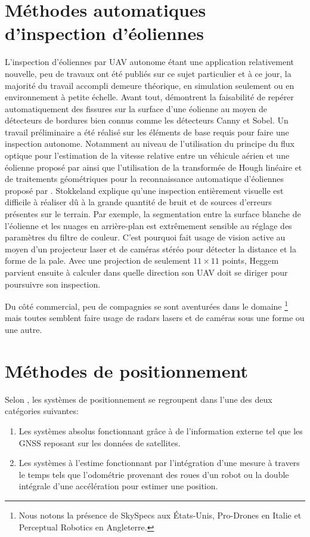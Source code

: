 \section{Méthodes automatiques d'inspection d'éoliennes}\label{subsec:eolienne}

L'inspection d'éoliennes par UAV autonome étant une application relativement nouvelle, peu de travaux ont été publiés sur ce sujet particulier et à ce jour, la majorité du travail accompli demeure théorique, en simulation seulement ou en environnement à petite échelle. Avant tout, \cite{Zhang2014} démontrent la faisabilité de repérer automatiquement des fissures sur la surface d'une éolienne au moyen de détecteurs de bordures bien connus comme les détecteurs Canny et Sobel. Un travail préliminaire a été réalisé sur les éléments de base requis pour faire une inspection autonome. Notamment au niveau de l'utilisation du principe du flux optique pour l'estimation de la vitesse relative entre un véhicule aérien et une éolienne proposé par \cite{Hoglund2014} ainsi que l'utilisation de la transformée de Hough linéaire et de traitements géométriques pour la reconnaissance automatique d'éoliennes proposé par \cite{Stokkeland2015}. Stokkeland explique qu'une inspection entièrement visuelle est difficile à réaliser dû à la grande quantité de bruit et de sources d'erreurs présentes sur le terrain. Par exemple, la segmentation entre la surface blanche de l'éolienne et les nuages en arrière-plan est extrêmement sensible au réglage des paramètres du filtre de couleur. C'est pourquoi \cite{Heggem2017} fait usage de vision active au moyen d'un projecteur laser et de caméras stéréo pour détecter la distance et la forme de la pale. Avec une projection de seulement $11 \times 11$ points, Heggem parvient ensuite à calculer dans quelle direction son UAV doit se diriger pour poursuivre son inspection.

Du côté commercial, peu de compagnies se sont aventurées dans le domaine \footnote{Nous notons la présence de SkySpecs aux États-Unis, Pro-Drones en Italie et Perceptual Robotics en Angleterre.} mais toutes semblent faire usage de radars lasers et de caméras sous une forme ou une autre.

\section{Méthodes de positionnement}\label{subsec:positionnement}

Selon \cite{Borenstein1997}, les systèmes de positionnement se regroupent dans l'une des deux catégories suivantes:
\begin{enumerate}
  \item Les systèmes absolus fonctionnant grâce à de l'information externe tel que les GNSS reposant sur les données de satellites.
  \item Les systèmes à l'estime fonctionnant par l'intégration d'une mesure à travers le temps tels que l'odométrie provenant des roues d'un robot ou la double intégrale d'une accélération pour estimer une position.
\end{enumerate}

